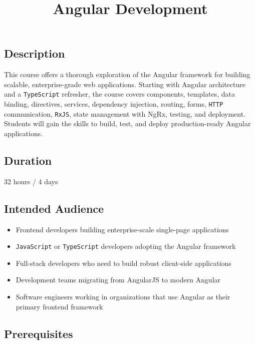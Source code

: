 \documentclass[
]{article}
\title{Angular Development}
\author{}
\date{}
\providecommand{\tightlist}{%
  \setlength{\itemsep}{0pt}\setlength{\parskip}{0pt}}
\begin{document}
\maketitle

\subsection{Description}\label{description}

This course offers a thorough exploration of the Angular framework for
building scalable, enterprise-grade web applications. Starting with
Angular architecture and a \texttt{TypeScript} refresher, the course
covers components, templates, data binding, directives, services,
dependency injection, routing, forms, \texttt{HTTP} communication,
\texttt{RxJS}, state management with NgRx, testing, and deployment.
Students will gain the skills to build, test, and deploy
production-ready Angular applications.

\subsection{Duration}\label{duration}

32 hours / 4 days

\subsection{Intended Audience}\label{intended-audience}

\begin{itemize}
\tightlist
\item
  Frontend developers building enterprise-scale single-page applications
\item
  \texttt{JavaScript} or \texttt{TypeScript} developers adopting the
  Angular framework
\item
  Full-stack developers who need to build robust client-side
  applications
\item
  Development teams migrating from AngularJS to modern Angular
\item
  Software engineers working in organizations that use Angular as their
  primary frontend framework
\end{itemize}

\subsection{Prerequisites}\label{prerequisites}
\end{document}
